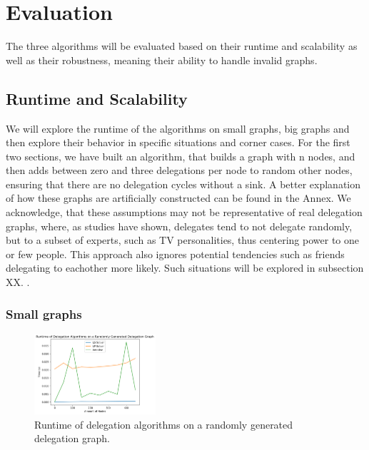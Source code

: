 \graphicspath{ {./figures/} }

\chapter{Evaluation}


The three algorithms will be evaluated based on their runtime and scalability as well as their robustness, meaning their ability to handle invalid graphs. 

\section{Runtime and Scalability}

We will explore the runtime of the algorithms on small graphs, big graphs and then explore their behavior in specific situations and corner cases. For the first two sections, we have built an algorithm, that builds a graph with n nodes, and then adds between zero and three delegations per node to random other nodes, ensuring that there are no delegation cycles without a sink. A better explanation of how these graphs are artificially constructed can be found in the Annex.  We acknowledge, that these assumptions may not be representative of real delegation graphs, where, as studies have shown, delegates tend to not delegate randomly, but to a subset of experts, such as TV personalities, thus centering power to one or few people. This approach also ignores potential tendencies such as friends delegating to eachother more likely. Such situations will be explored in subsection XX. .

\subsection{Small graphs}

\begin{figure}[h]
    \centering
    \includegraphics[width=0.4\textwidth]{0-500_random}
    \caption{Runtime of delegation algorithms on a randomly generated delegation graph.}
    \label{fig:random-small}
\end{figure}

